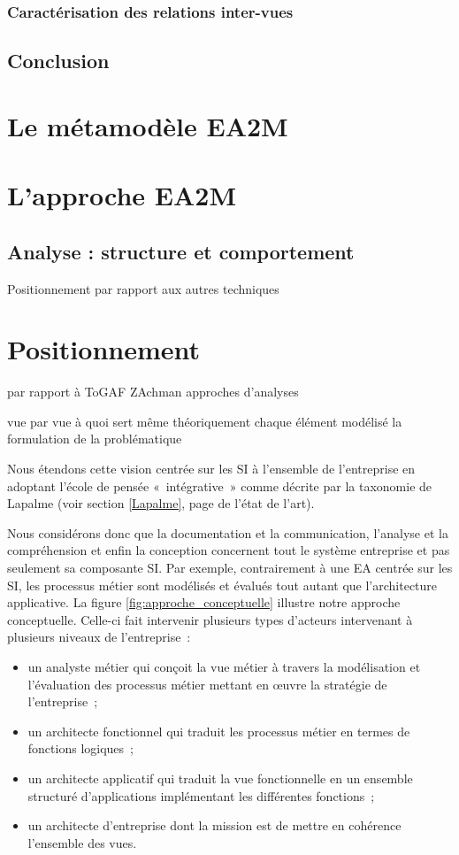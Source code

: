     \subsubsection{Caractérisation des relations inter-vues}
    \subsection{Conclusion}


\section{Le métamodèle EA2M}


\section{L'approche EA2M}

\subsection{Analyse : structure et comportement}
Positionnement par rapport aux autres techniques

\section{Positionnement}
par rapport à ToGAF
ZAchman
approches d'analyses

vue par vue à quoi sert même théoriquement
chaque élément modélisé la formulation de la problématique


Nous étendons
cette vision centrée sur les SI à l'ensemble de l'entreprise en adoptant l'école
de pensée «~intégrative~» comme décrite par la taxonomie de Lapalme (voir
section \ref{Lapalme}, page \pageref{Lapalme} de l'état de l'art).

Nous considérons donc que la documentation et la communication, l'analyse et la
compréhension et enfin la conception concernent tout le système entreprise et
pas seulement sa composante SI. Par exemple, contrairement à une EA centrée sur
les SI, les processus métier sont modélisés et évalués tout autant que
l'architecture applicative. La figure \ref{fig:approche_conceptuelle} illustre
notre approche conceptuelle. Celle-ci fait intervenir plusieurs types d'acteurs
intervenant à plusieurs niveaux de l'entreprise~: \begin{itemize} \item un
analyste métier qui conçoit la vue métier à travers la modélisation et
l'évaluation des processus métier mettant en œuvre la stratégie de
l'entreprise~; \item un architecte fonctionnel qui traduit les processus métier
en termes de fonctions logiques~; \item un architecte applicatif qui traduit la
vue fonctionnelle en un ensemble structuré d'applications implémentant les
différentes fonctions~; \item un architecte d'entreprise dont la mission est de
mettre en cohérence l'ensemble des vues. \end{itemize}

